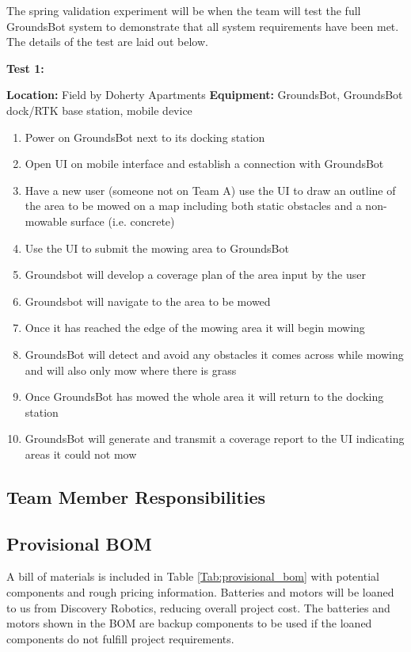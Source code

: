 \documentclass[12pt]{extarticle}
\begin{document}
	The spring validation experiment will be when the team will test the full GroundsBot system to demonstrate that all system requirements have been met. The details of the test are laid out below.
\begin{center}
\textbf{Test 1: }
\end{center}
\textbf{Location:} Field by Doherty Apartments
\textbf{Equipment:} GroundsBot, GroundsBot dock/RTK base station, mobile device
\begin{enumerate}
  \item Power on GroundsBot next to its docking station
  \item Open UI on mobile interface and establish a connection with GroundsBot
  \item Have a new user (someone not on Team A) use the UI to draw an outline of the area to be mowed on a map including both static obstacles and a non-mowable surface (i.e. concrete)
  \item Use the UI to submit the mowing area to GroundsBot
  \item Groundsbot will develop a coverage plan of the area input by the user
  \item Groundsbot will navigate to the area to be mowed
  \item Once it has reached the edge of the mowing area it will begin mowing
  \item GroundsBot will detect and avoid any obstacles it comes across while mowing and will also only mow where there is grass
  \item Once GroundsBot has mowed the whole area it will return to the docking station
  \item GroundsBot will generate and transmit a coverage report to the UI indicating areas it could not mow
\end{enumerate}

\subsection{Team Member Responsibilities}





\subsection{Provisional BOM}
A bill of materials is included in Table \ref{Tab:provisional_bom} with potential components and rough pricing information. Batteries and motors will be loaned to us from Discovery Robotics, reducing overall project cost. The batteries and motors shown in the BOM are backup components to be used if the loaned components do not fulfill project requirements.
\end{document}

